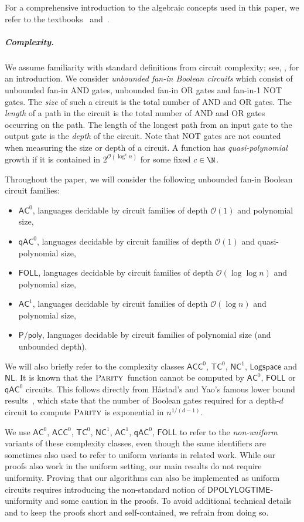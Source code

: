 \documentclass{toc}
\newcommand{\bigO}{\mathcal{O}}
\newcommand{\FOLL}{\ensuremath{\mathsf{FOLL}}}
\newcommand{\AC}{\ensuremath{\mathsf{AC}}}
\newcommand{\ACC}{\ensuremath{\mathsf{ACC}}}
\newcommand{\qAC}{\ensuremath{\mathsf{qAC}}}
\newcommand{\TC}{\ensuremath{\mathsf{TC}}}
\newcommand{\NC}{\ensuremath{\mathsf{NC}}}
\newcommand{\LOGSPACE}{\ensuremath{\mathsf{Logspace}}}
\newcommand{\NL}{\ensuremath{\mathsf{NL}}}
\newcommand{\Ppoly}{\ensuremath{\mathsf{P / poly}}}
\newcommand{\DPOLYLOGTIME}{\ensuremath{\mathsf{DPOLYLOGTIME}}}
\newcommand{\Parity}{\ensuremath{\textsc{Parity}}}
\begin{document}
For a comprehensive introduction to the algebraic concepts used in this paper,
we refer to the textbooks~\cite{Howie95} and~\cite{pin86}.

\subparagraph{Complexity.}

We assume familiarity with standard definitions from circuit complexity;
see, \eg, %
\cite{Vollmer99} for an introduction.
%
We consider \emph{unbounded fan-in Boolean circuits} which consist of unbounded
fan-in AND gates, unbounded fan-in OR gates and fan-in-1 NOT gates.
%
The \emph{size} of such a circuit is the total number of AND and OR gates.
%
The \emph{length} of a path in the circuit is the total number of AND and OR
gates occurring on the path.
%
The length of the longest path from an input gate to the output gate is the
\emph{depth} of the circuit.
%
Note that NOT gates are not counted when measuring the size or depth of a
circuit.
%
A function has \emph{quasi-polynomial} growth if it is contained in
$2^{\bigO(\log^c n)}$ for some fixed $c \in \N$.

Throughout the paper, we will consider the following unbounded fan-in Boolean
circuit families:
%
\begin{itemize}
  \item $\AC^0$, languages decidable by circuit families of depth $\bigO(1)$
    and polynomial size,
  \item $\qAC^0$, languages decidable by circuit families of depth $\bigO(1)$
    and quasi-polynomial size,
  \item $\FOLL$, languages decidable by circuit families of depth
    $\bigO(\log \log n)$ and polynomial size,
  \item $\AC^1$, languages decidable by circuit families of depth
    $\bigO(\log n)$ and polynomial size,
  \item $\Ppoly$, languages decidable by circuit families of polynomial size
    (and unbounded depth).
\end{itemize}

We will also briefly refer to the complexity classes $\ACC^0$, $\TC^0$,
$\NC^1$, $\LOGSPACE$ and $\NL$.
%
It is known that the \Parity~function cannot be computed by $\AC^0$, $\FOLL$ or
$\qAC^0$ circuits. This follows directly from H{\aa}stad's and Yao's famous
lower bound results~\cite{Hastad86,Yao85}, which state that the number of
Boolean gates required for a depth-$d$ circuit to compute $\Parity$ is
exponential in $n^{1/(d-1)}$.

\begin{remark}
  We use $\AC^0$, $\ACC^0$, $\TC^0$, $\NC^1$, $\AC^1$, $\qAC^0$, $\FOLL$ to
  refer to the \emph{non-uniform} variants of these complexity classes, even
  though the same identifiers are sometimes also used to refer to uniform
  variants in related work.
  While our proofs also work in the uniform setting, our main results do not
  require uniformity.
  Proving that our algorithms can also be implemented as uniform circuits
  requires introducing the non-standard notion of $\DPOLYLOGTIME$-uniformity
  and some caution in the proofs. To avoid additional technical details and to
  keep the proofs short and self-contained, we refrain from doing so.
  \label{}
\end{remark}
\end{document}
